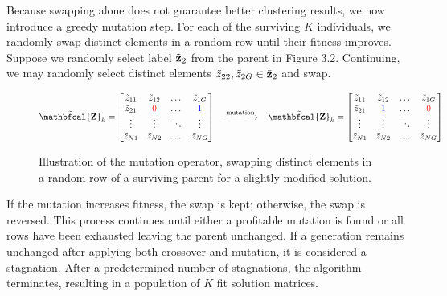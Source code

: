 \documentclass[12pt]{report}
\begin{document}
Because swapping alone does not guarantee better clustering results, we now introduce a greedy mutation step. For each of the surviving $K$ individuals, we randomly swap distinct elements in a random row until their fitness improves. Suppose we randomly select label $\tilde{\bf z}_2$ from the parent in Figure 3.2. Continuing, we may randomly select distinct elements $\tilde{z}_{22}, \tilde{z}_{2G} \in \tilde{\bf z}_2$ and swap. 
\vspace{0.5cm}
\begin{figure}[H]
$$\tilde{ {\bf \mathbfcal{Z}} }_{k}  = 
\begin{bmatrix}
    \tilde{z}_{11} & \tilde{z}_{12} & \dots & \tilde{z}_{1G} \\
    \tilde{z}_{21} & \textcolor{red}{0} & \dots & \textcolor{blue}{1} \\
    \vdots & \vdots & \ddots & \vdots \\
    \tilde{z}_{N1}& \tilde{z}_{N2}& \dots & \tilde{z}_{NG}\\
\end{bmatrix} 
\;
\;
\;
\xrightarrow{\text{mutation}}
\;
\;
\;
\tilde{ {\bf \mathbfcal{Z}} }_{k} = 
\begin{bmatrix}
    \tilde{z}_{11} & \tilde{z}_{12} & \dots & \tilde{z}_{1G} \\
    \tilde{z}_{21} & \textcolor{blue}{1} & \dots & \textcolor{red}{0} \\
    \vdots & \vdots & \ddots & \vdots \\
    \tilde{z}_{N1}& \tilde{z}_{N2}& \dots & \tilde{z}_{NG}\\
\end{bmatrix}$$
\vspace{-0.5cm}
\caption{Illustration of the mutation operator, swapping distinct elements in a random row of a surviving parent for a slightly modified solution.}
\end{figure}

If the mutation increases fitness, the swap is kept; otherwise, the swap is reversed. This process continues until either a profitable mutation is found or all rows have been exhausted leaving the parent unchanged. If a generation remains unchanged after applying both crossover and mutation, it is considered a stagnation. After a predetermined number of stagnations, the algorithm terminates, resulting in a population of $K$ fit solution matrices.
\end{document}
